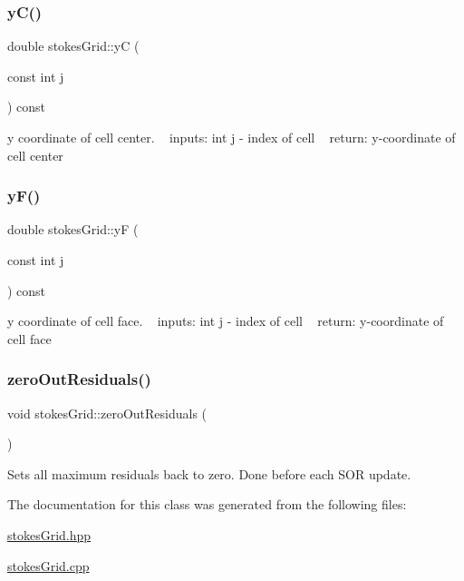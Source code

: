 \subsubsection{\texorpdfstring{y\+C()}{yC()}}
{\footnotesize\ttfamily double stokes\+Grid\+::yC (\begin{DoxyParamCaption}\item[{const int}]{j }\end{DoxyParamCaption}) const}

y coordinate of cell center. ~\newline
inputs\+: int j -\/ index of cell ~\newline
return\+: y-\/coordinate of cell center \mbox{\label{classstokesGrid_a101e786b6f6bc39c909ff0bc36d2f62e}} 
\subsubsection{\texorpdfstring{y\+F()}{yF()}}
{\footnotesize\ttfamily double stokes\+Grid\+::yF (\begin{DoxyParamCaption}\item[{const int}]{j }\end{DoxyParamCaption}) const}

y coordinate of cell face. ~\newline
inputs\+: int j -\/ index of cell ~\newline
return\+: y-\/coordinate of cell face \mbox{\label{classstokesGrid_a2df782e6f854c2d9ad4c02e7b9a05a02}} 
\subsubsection{\texorpdfstring{zero\+Out\+Residuals()}{zeroOutResiduals()}}
{\footnotesize\ttfamily void stokes\+Grid\+::zero\+Out\+Residuals (\begin{DoxyParamCaption}{ }\end{DoxyParamCaption})}

Sets all maximum residuals back to zero. Done before each S\+OR update. 

The documentation for this class was generated from the following files\+:\begin{DoxyCompactItemize}
\item 
\hyperlink{stokesGrid_8hpp}{stokes\+Grid.\+hpp}\item 
\hyperlink{stokesGrid_8cpp}{stokes\+Grid.\+cpp}\end{DoxyCompactItemize}
